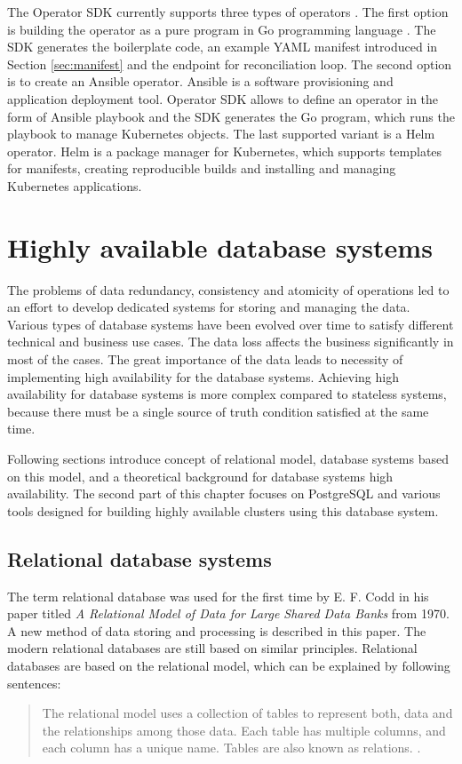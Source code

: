 \documentclass[
  digital, %
  twoside, %
  table,   %
  lof,     %
  lot,     %
]{fithesis3}
\begin{document}
The Operator SDK currently supports three types of operators \cite{operatorhub-sdk}. The first option is building the operator as a pure program in Go programming language \cite{golang}. The SDK generates the boilerplate code, an example YAML manifest introduced in Section \ref{sec:manifest} and the endpoint for reconciliation loop. The second option is to create an Ansible operator. Ansible \cite{ansible} is a software provisioning and application deployment tool. Operator SDK allows to define an operator in the form of Ansible playbook \cite{wwp} and the SDK generates the Go program, which runs the playbook to manage Kubernetes objects. The last supported variant is a Helm operator. Helm \cite{helm} is a package manager for Kubernetes, which supports templates for manifests, creating reproducible builds and installing and managing Kubernetes applications.

\chapter{Highly available database systems} \label{chap:ha_database_systems}
The problems of data redundancy, consistency and atomicity of operations led to an effort to develop dedicated systems for storing and managing the data. Various types of database systems have been evolved over time to satisfy different technical and business use cases. The data loss affects the business significantly in most of the cases. The great importance of the data leads to necessity of implementing high availability for the database systems. Achieving high availability for database systems is more complex compared to stateless systems, because there must be a single source of truth condition satisfied at the same time.

Following sections introduce concept of relational model, database systems based on this model, and a theoretical background for database systems high availability. The second part of this chapter focuses on PostgreSQL and various tools designed for building highly available clusters using this database system.

\section{Relational database systems}
The term relational database was used for the first time by E. F. Codd in his paper \cite{codd_relational_model} titled \textit{A Relational Model of Data for Large Shared Data Banks} from 1970. A new method of data storing and processing is described in this paper. The modern relational databases are still based on similar principles. Relational databases are based on the relational model, which can be explained by following sentences:
\begin{quote}
The relational model uses a collection of tables to represent both, data and the relationships among those data. Each table has multiple columns, and each column has a unique name. Tables are also known as relations. \cite[p. 9]{db}.
\end{quote}
\end{document}
